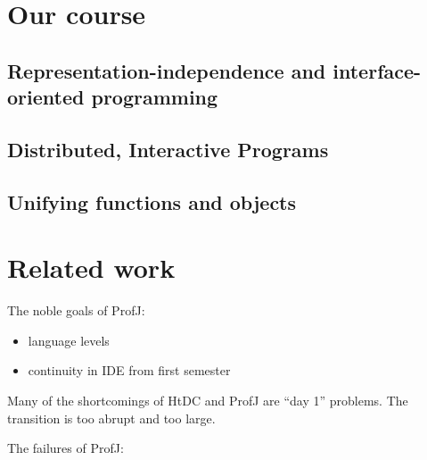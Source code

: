 \documentclass[submission,copyright]{eptcs}
\begin{document}
\section{Our course}
\label{sec:our-course}

\subsection{Representation-independence and interface-oriented programming}

\subsection{Distributed, Interactive Programs}

\subsection{Unifying functions and objects}


\section{Related work}
\label{sec:related-work}

\cite{dvanhorn:Gray2003ProfessorJ}

\cite{dvanhorn:Allen2002DrJava, dvanhorn:Hsia2005Taming}

\cite{dvanhorn:Kolling2003}

\cite{dvanhorn:Bruce2001Library}

\cite{dvanhorn:Alphonce2003Using}

\cite{dvanhorn:Chakravarty2004Risks}

\cite{dvanhorn:Ragde2008Chilling}

\cite{dvanhorn:Bloch2000Scheme}

The noble goals of ProfJ:

\begin{itemize}
\item language levels
\item continuity in IDE from first semester
\end{itemize}

Many of the shortcomings of HtDC and ProfJ are ``day 1'' problems.
The transition is too abrupt and too large.

The failures of  ProfJ:
\end{document}
